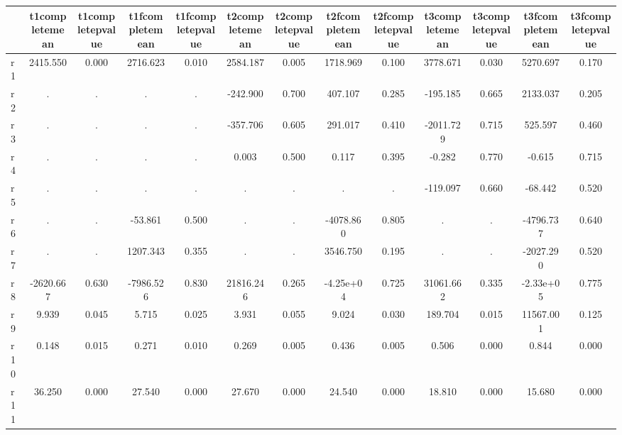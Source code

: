 \begin{table}[htbp]
\begin{tabular}{lcccccccccccc} \hline \hline
 & t1completemean  & t1completepvalue  & t1fcompletemean  & t1fcompletepvalue  & t2completemean  & t2completepvalue  & t2fcompletemean  & t2fcompletepvalue  & t3completemean  & t3completepvalue  & t3fcompletemean  & t3fcompletepvalue  \\  \hline 
r1 &  2415.550 &     0.000 &  2716.623 &     0.010 &  2584.187 &     0.005 &  1718.969 &     0.100 &  3778.671 &     0.030 &  5270.697 &     0.170 \\  
r2 &         . &         . &         . &         . &  -242.900 &     0.700 &   407.107 &     0.285 &  -195.185 &     0.665 &  2133.037 &     0.205 \\  
r3 &         . &         . &         . &         . &  -357.706 &     0.605 &   291.017 &     0.410 & -2011.729 &     0.715 &   525.597 &     0.460 \\  
r4 &         . &         . &         . &         . &     0.003 &     0.500 &     0.117 &     0.395 &    -0.282 &     0.770 &    -0.615 &     0.715 \\  
r5 &         . &         . &         . &         . &         . &         . &         . &         . &  -119.097 &     0.660 &   -68.442 &     0.520 \\  
r6 &         . &         . &   -53.861 &     0.500 &         . &         . & -4078.860 &     0.805 &         . &         . & -4796.737 &     0.640 \\  
r7 &         . &         . &  1207.343 &     0.355 &         . &         . &  3546.750 &     0.195 &         . &         . & -2027.290 &     0.520 \\  
r8 & -2620.667 &     0.630 & -7986.526 &     0.830 & 21816.246 &     0.265 & -4.25e+04 &     0.725 & 31061.662 &     0.335 & -2.33e+05 &     0.775 \\  
r9 &     9.939 &     0.045 &     5.715 &     0.025 &     3.931 &     0.055 &     9.024 &     0.030 &   189.704 &     0.015 & 11567.001 &     0.125 \\  
r10 &     0.148 &     0.015 &     0.271 &     0.010 &     0.269 &     0.005 &     0.436 &     0.005 &     0.506 &     0.000 &     0.844 &     0.000 \\  
r11 &    36.250 &     0.000 &    27.540 &     0.000 &    27.670 &     0.000 &    24.540 &     0.000 &    18.810 &     0.000 &    15.680 &     0.000 \\  
\hline \hline \end{tabular}
\end{table}
